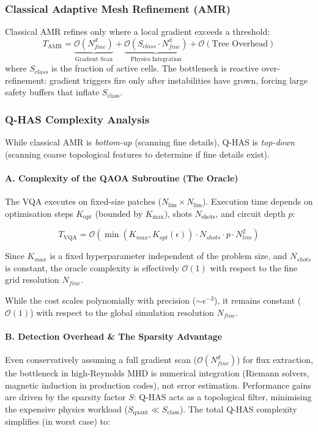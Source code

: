 \documentclass[12pt, a4paper, oneside]{report}
\begin{document}
\subsubsection{Classical Adaptive Mesh Refinement (AMR)}
Classical AMR refines only where a local gradient exceeds a threshold:
\begin{equation}
    T_{\text{AMR}} = \underbrace{\mathcal{O}(N_{fine}^d)}_{\text{Gradient Scan}} + \underbrace{\mathcal{O}(S_{class} \cdot N_{fine}^d)}_{\text{Physics Integration}} + \mathcal{O}(\text{Tree Overhead})
\end{equation}
where $S_{class}$ is the fraction of active cells. The bottleneck is reactive over-refinement: gradient triggers fire only after instabilities have grown, forcing large safety buffers that inflate $S_{\text{class}}$.

\subsubsection{Q-HAS Complexity Analysis}
While classical AMR is \textit{bottom-up} (scanning fine details), Q-HAS is \textit{top-down} (scanning coarse topological features to determine if fine details exist).

\paragraph{A. Complexity of the QAOA Subroutine (The Oracle)}
The VQA executes on fixed-size patches ($N_{\text{lim}} \times N_{\text{lim}}$). Execution time depends on optimisation steps $K_{\text{opt}}$ (bounded by $K_{\text{max}}$), shots $N_{\text{shots}}$, and circuit depth $p$:

\begin{equation}
    T_{\text{VQA}} = \mathcal{O}\left( \min(K_{max}, K_{opt}(\epsilon)) \cdot N_{shots} \cdot p \cdot N_{lim}^2 \right)
\end{equation}

Since $K_{max}$ is a fixed hyperparameter independent of the problem size, and $N_{shots}$ is constant, the oracle complexity is effectively $\mathcal{O}(1)$ with respect to the fine grid resolution $N_{fine}$.

While the cost scales polynomially with precision ($\sim \epsilon^{-3}$), it remains constant ($\mathcal{O}(1)$) with respect to the global simulation resolution $N_{fine}$.

\paragraph{B. Detection Overhead \& The Sparsity Advantage}
Even conservatively assuming a full gradient scan ($\mathcal{O}(N_{fine}^d)$) for flux extraction, the bottleneck in high-Reynolds MHD is numerical integration (Riemann solvers, magnetic induction in production codes), not error estimation. Performance gains are driven by the sparsity factor $S$: Q-HAS acts as a topological filter, minimising the expensive physics workload ($S_{\text{quant}} \ll S_{\text{class}}$). The total Q-HAS complexity simplifies (in worst case) to:
\end{document}

